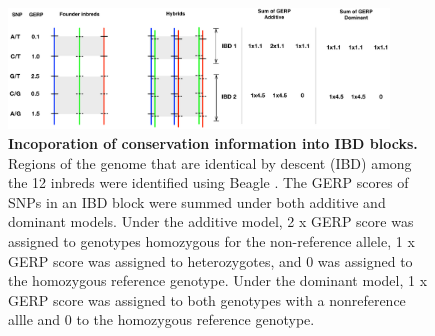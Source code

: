 \documentclass[9pt,twocolumn,twoside]{gsajnl}
\begin{document}
\begin{figure}[here]
\includegraphics[width=0.9\textwidth]{SFig_gerpIBD.pdf}
\caption{
\textbf{Incoporation of conservation information into IBD blocks.}
Regions of the genome that are identical by descent (IBD) among the 12 inbreds were identified using Beagle \citep{Browning2009}.  The GERP scores of SNPs in an IBD block were summed under both additive and dominant models. Under the additive model, 2 x GERP score was assigned to genotypes homozygous for the non-reference allele, 1 x GERP score was assigned to heterozygotes, and 0 was assigned to the homozygous reference genotype. Under the dominant model, 1 x GERP score was assigned to both genotypes with a nonreference allle and 0 to the homozygous reference genotype.}
\label{fig:gerpibd}
\end{figure}
\end{document}
